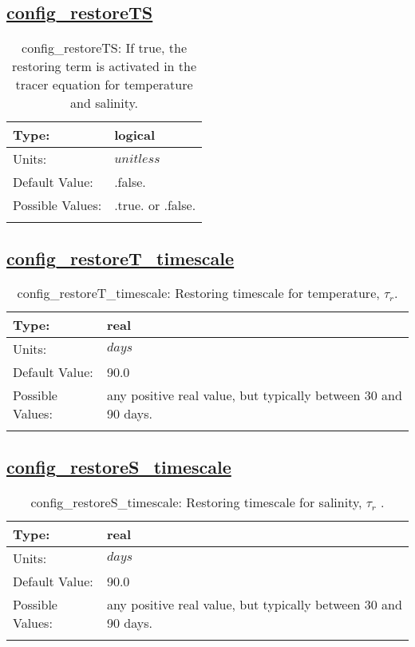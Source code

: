 \subsection[config\_restoreTS]{\hyperref[sec:nm_tab_forcing]{config\_restoreTS}}
\label{subsec:nm_sec_config_restoreTS}
\begin{center}
\begin{longtable}{| p{2.0in} | p{4.0in} |}
    \hline
    Type: & logical \\
    \hline
    Units: & $unitless$ \\
    \hline
    Default Value: & .false. \\
    \hline
    Possible Values: & .true. or .false. \\
    \hline
    \caption{config\_restoreTS: If true, the restoring term is activated in the tracer equation for temperature and salinity.}
\end{longtable}
\end{center}
\subsection[config\_restoreT\_timescale]{\hyperref[sec:nm_tab_forcing]{config\_restoreT\_timescale}}
\label{subsec:nm_sec_config_restoreT_timescale}
\begin{center}
\begin{longtable}{| p{2.0in} | p{4.0in} |}
    \hline
    Type: & real \\
    \hline
    Units: & $days$ \\
    \hline
    Default Value: & 90.0 \\
    \hline
    Possible Values: & any positive real value, but typically between 30 and 90 days. \\
    \hline
    \caption{config\_restoreT\_timescale:  Restoring timescale for temperature,  $\tau_r.$ }
\end{longtable}
\end{center}
\subsection[config\_restoreS\_timescale]{\hyperref[sec:nm_tab_forcing]{config\_restoreS\_timescale}}
\label{subsec:nm_sec_config_restoreS_timescale}
\begin{center}
\begin{longtable}{| p{2.0in} | p{4.0in} |}
    \hline
    Type: & real \\
    \hline
    Units: & $days$ \\
    \hline
    Default Value: & 90.0 \\
    \hline
    Possible Values: & any positive real value, but typically between 30 and 90 days. \\
    \hline
    \caption{config\_restoreS\_timescale:  Restoring timescale for salinity,  $\tau_r$ .}
\end{longtable}
\end{center}
